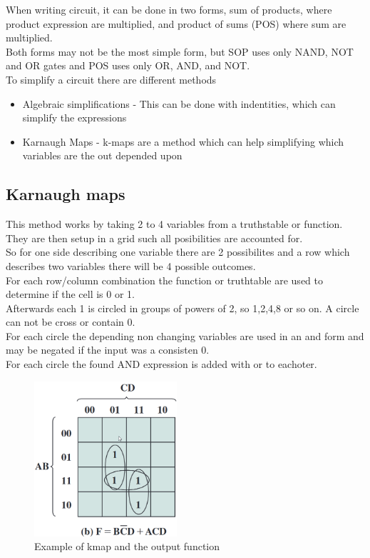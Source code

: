 \documentclass[12pt, a4paper]{article}
\begin{document}
			When writing circuit, it can be done in two forms, sum of products, where product expression are multiplied, and product of sums (POS) where sum are multiplied.\\
			Both forms may not be the most simple form, but SOP uses only NAND, NOT and OR gates and POS uses only OR, AND, and NOT.\\
			To simplify a circuit there are different methods
			\begin{itemize}
				\item Algebraic simplifications - This can be done with indentities, which can simplify the expressions
				\item Karnaugh Maps - k-maps are a method which can help simplifying which variables are the out depended upon
			\end{itemize}
			
			\subsection{Karnaugh maps}
				This method works by taking 2 to 4 variables from a truthstable or function. They are then setup in a grid such all posibilities are accounted for.\\
				So for one side describing one variable there are 2 possibilites and a row which describes two variables there will be 4 possible outcomes.\\
				For each row/column combination the function or truthtable are used to determine if the cell is 0 or 1.\\
				Afterwards each 1 is circled in groups of powers of 2, so 1,2,4,8 or so on. A circle can not be cross or contain 0.\\
				For each circle the depending non changing variables are used in an and form and may be negated if the input was a consisten 0.\\
				For each circle the found AND expression is added with or to eachoter.
				\begin{figure}[h!]
					\includegraphics[width=200px]{assets/kmap.png}
					\centering
					\caption{Example of kmap and the output function}
				\end{figure}
\end{document}
